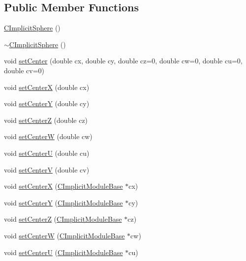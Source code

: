 \subsection*{Public Member Functions}
\begin{DoxyCompactItemize}
\item 
\hyperlink{classanl_1_1CImplicitSphere_acccac7206a89d32344bd0081689645f6}{CImplicitSphere} ()
\item 
\hyperlink{classanl_1_1CImplicitSphere_a44fdc72d5a96ce284b0ceee69d61fda9}{$\sim$CImplicitSphere} ()
\item 
void \hyperlink{classanl_1_1CImplicitSphere_a2b3dfb1813078c5b898510459610038c}{setCenter} (double cx, double cy, double cz=0, double cw=0, double cu=0, double cv=0)
\item 
void \hyperlink{classanl_1_1CImplicitSphere_a8e7d41f51040ed8732e6015a5a02f206}{setCenterX} (double cx)
\item 
void \hyperlink{classanl_1_1CImplicitSphere_a7df3f8521d551f9b08014c30a6a917d0}{setCenterY} (double cy)
\item 
void \hyperlink{classanl_1_1CImplicitSphere_a9c6f2313e77a5a0072a0adaf21f0c1d9}{setCenterZ} (double cz)
\item 
void \hyperlink{classanl_1_1CImplicitSphere_a79df7ce2dc6e08563c7b2da47959b837}{setCenterW} (double cw)
\item 
void \hyperlink{classanl_1_1CImplicitSphere_a2cb21e86ad213bb88e5350b9ec9d89de}{setCenterU} (double cu)
\item 
void \hyperlink{classanl_1_1CImplicitSphere_a136a294c116b255a2744618617080f68}{setCenterV} (double cv)
\item 
void \hyperlink{classanl_1_1CImplicitSphere_acf9a22d7ae341decfb5d0d861ee10f10}{setCenterX} (\hyperlink{classanl_1_1CImplicitModuleBase}{CImplicitModuleBase} $\ast$cx)
\item 
void \hyperlink{classanl_1_1CImplicitSphere_a21348b975828308142a2cbdd62e76b42}{setCenterY} (\hyperlink{classanl_1_1CImplicitModuleBase}{CImplicitModuleBase} $\ast$cy)
\item 
void \hyperlink{classanl_1_1CImplicitSphere_a62662af517040582cdecf30e8b1e5874}{setCenterZ} (\hyperlink{classanl_1_1CImplicitModuleBase}{CImplicitModuleBase} $\ast$cz)
\item 
void \hyperlink{classanl_1_1CImplicitSphere_a089b5405d3eed1b5d80d7af0e671df59}{setCenterW} (\hyperlink{classanl_1_1CImplicitModuleBase}{CImplicitModuleBase} $\ast$cw)
\item 
void \hyperlink{classanl_1_1CImplicitSphere_a22660d1fb812609ae063a78a45757f46}{setCenterU} (\hyperlink{classanl_1_1CImplicitModuleBase}{CImplicitModuleBase} $\ast$cu)

\end{DoxyCompactItemize}
